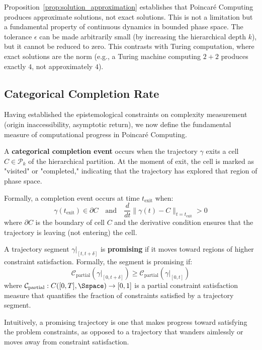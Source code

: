 \begin{remark}
\label{rem:exactness}
Proposition~\ref{prop:solution_approximation} establishes that Poincaré Computing produces approximate solutions, not exact solutions. This is not a limitation but a fundamental property of continuous dynamics in bounded phase space. The tolerance $\epsilon$ can be made arbitrarily small (by increasing the hierarchical depth $k$), but it cannot be reduced to zero. This contrasts with Turing computation, where exact solutions are the norm (e.g., a Turing machine computing $2 + 2$ produces exactly $4$, not approximately $4$).
\end{remark}

\subsection{Categorical Completion Rate}

Having established the epistemological constraints on complexity measurement (origin inaccessibility, asymptotic return), we now define the fundamental measure of computational progress in Poincaré Computing.

\begin{definition}
\label{def:completion_event}
A \textbf{categorical completion event} occurs when the trajectory $\gamma$ exits a cell $C \in \mathcal{P}_k$ of the hierarchical partition. At the moment of exit, the cell is marked as "visited" or "completed," indicating that the trajectory has explored that region of phase space.

Formally, a completion event occurs at time $t_{\text{exit}}$ when:
\begin{equation}
\gamma(t_{\text{exit}}) \in \partial C \quad \text{and} \quad \frac{d}{dt}\|\gamma(t) - C\|_{t=t_{\text{exit}}} > 0
\end{equation}
where $\partial C$ is the boundary of cell $C$ and the derivative condition ensures that the trajectory is leaving (not entering) the cell.
\end{definition}

\begin{definition}
\label{def:promising_trajectory}
A trajectory segment $\gamma|_{[t, t+\delta]}$ is \textbf{promising} if it moves toward regions of higher constraint satisfaction. Formally, the segment is promising if:
\begin{equation}
\mathcal{C}_{\text{partial}}(\gamma|_{[0, t+\delta]}) \geq \mathcal{C}_{\text{partial}}(\gamma|_{[0, t]})
\label{eq:promising_condition}
\end{equation}
where $\mathcal{C}_{\text{partial}}: C([0,T], \Sspace) \to [0,1]$ is a partial constraint satisfaction measure that quantifies the fraction of constraints satisfied by a trajectory segment.

Intuitively, a promising trajectory is one that makes progress toward satisfying the problem constraints, as opposed to a trajectory that wanders aimlessly or moves away from constraint satisfaction.
\end{definition}

